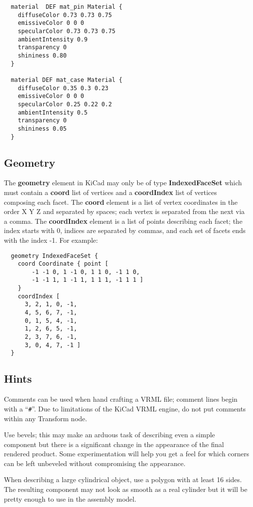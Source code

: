 \documentclass[a4paper, dvipdfm]{article}
\begin{document}
\begin{verbatim}
  material  DEF mat_pin Material {
    diffuseColor 0.73 0.73 0.75
    emissiveColor 0 0 0
    specularColor 0.73 0.73 0.75
    ambientIntensity 0.9
    transparency 0
    shininess 0.80
  }

  material DEF mat_case Material {
    diffuseColor 0.35 0.3 0.23
    emissiveColor 0 0 0
    specularColor 0.25 0.22 0.2
    ambientIntensity 0.5
    transparency 0
    shininess 0.05
  }
\end{verbatim}

\subsection{Geometry}
The \textbf{geometry} element in KiCad may only be of type \textbf{IndexedFaceSet} which must contain a
\textbf{coord} list of vertices and a \textbf{coordIndex} list of vertices composing each facet.
The \textbf{coord} element is a list of vertex coordinates in the order X Y Z and separated by spaces;
each vertex is separated from the next via a comma. The \textbf{coordIndex} element is a list of points
describing each facet; the index starts with 0, indices are separated by commas, and each set of facets
ends with the index -1. For example:

\begin{verbatim}
  geometry IndexedFaceSet {
    coord Coordinate { point [
        -1 -1 0, 1 -1 0, 1 1 0, -1 1 0,
        -1 -1 1, 1 -1 1, 1 1 1, -1 1 1 ]
    }
    coordIndex [
      3, 2, 1, 0, -1,
      4, 5, 6, 7, -1,
      0, 1, 5, 4, -1,
      1, 2, 6, 5, -1,
      2, 3, 7, 6, -1,
      3, 0, 4, 7, -1 ]
  }
\end{verbatim}

\subsection{Hints}
Comments can be used when hand crafting a VRML file; comment lines begin with a ``\verb~#~''. Due to
limitations of the KiCad VRML engine, do not put comments within any Transform node.

Use bevels; this may make an arduous task of describing even a simple component but there is a significant
change in the appearance of the final rendered product. Some experimentation will help you get a feel for
which corners can be left unbeveled without compromising the appearance.

When describing a large cylindrical object, use a polygon with at least 16 sides. The resulting component
may not look as smooth as a real cylinder but it will be pretty enough to use in the assembly model.
\end{document}
